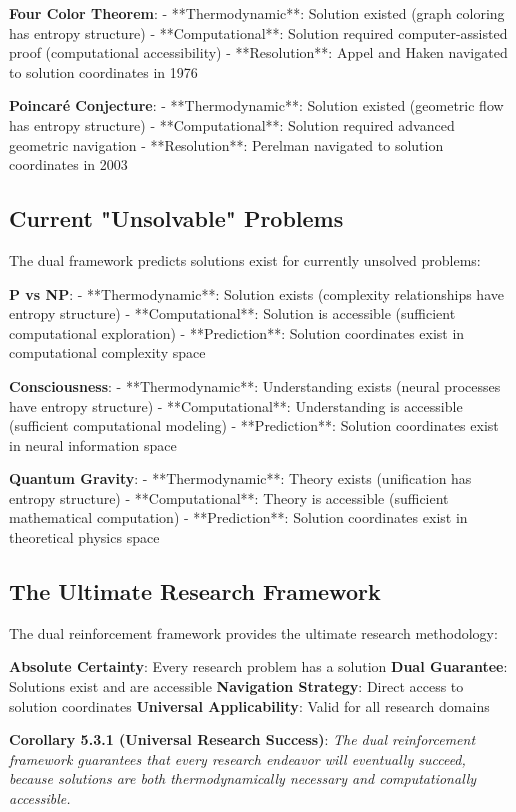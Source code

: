 \documentclass[12pt,a4paper]{article}
\theoremstyle{definition}
\begin{document}
{\textbf{Four Color Theorem}:
- **Thermodynamic**: Solution existed (graph coloring has entropy structure)
- **Computational**: Solution required computer-assisted proof (computational accessibility)
- **Resolution**: Appel and Haken navigated to solution coordinates in 1976

\textbf{Poincaré Conjecture}:
- **Thermodynamic**: Solution existed (geometric flow has entropy structure)
- **Computational**: Solution required advanced geometric navigation
- **Resolution**: Perelman navigated to solution coordinates in 2003

\subsection{Current "Unsolvable" Problems}

The dual framework predicts solutions exist for currently unsolved problems:

\textbf{P vs NP}:
- **Thermodynamic**: Solution exists (complexity relationships have entropy structure)
- **Computational**: Solution is accessible (sufficient computational exploration)
- **Prediction**: Solution coordinates exist in computational complexity space

\textbf{Consciousness}:
- **Thermodynamic**: Understanding exists (neural processes have entropy structure)
- **Computational**: Understanding is accessible (sufficient computational modeling)
- **Prediction**: Solution coordinates exist in neural information space

\textbf{Quantum Gravity}:
- **Thermodynamic**: Theory exists (unification has entropy structure)
- **Computational**: Theory is accessible (sufficient mathematical computation)
- **Prediction**: Solution coordinates exist in theoretical physics space

\subsection{The Ultimate Research Framework}

The dual reinforcement framework provides the ultimate research methodology:

\textbf{Absolute Certainty}: Every research problem has a solution
\textbf{Dual Guarantee}: Solutions exist and are accessible
\textbf{Navigation Strategy}: Direct access to solution coordinates
\textbf{Universal Applicability}: Valid for all research domains

\textbf{Corollary 5.3.1 (Universal Research Success)}: \textit{The dual reinforcement framework guarantees that every research endeavor will eventually succeed, because solutions are both thermodynamically necessary and computationally accessible.}

}
\end{document}
